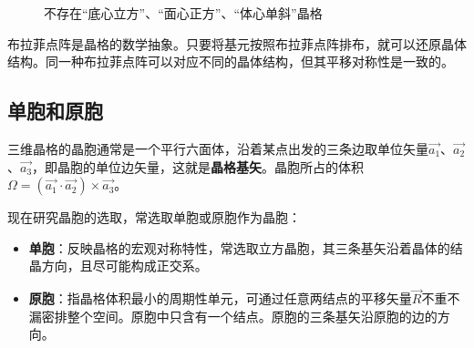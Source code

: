 \begin{figure}[!htbp]
\begin{minipage}[t]{0.3\linewidth}
        \end{minipage}
        \caption{不存在“底心立方”、“面心正方”、“体心单斜”晶格}
        \label{fig:1-06}
    \end{figure}

    布拉菲点阵是晶格的数学抽象。只要将基元按照布拉菲点阵排布，就可以还原晶体结构。同一种布拉菲点阵可以对应不同的晶体结构，但其平移对称性是一致的。

\subsection{单胞和原胞}
    三维晶格的晶胞通常是一个平行六面体，沿着某点出发的三条边取单位矢量$\vec{a_1}$、$\vec{a_2}$、$\vec{a_3}$，即晶胞的单位边矢量，这就是\textbf{晶格基矢}。晶胞所占的体积$\Omega=(\vec{a_1}\cdot \vec{a_2})\times \vec{a_3}$。

    现在研究晶胞的选取，常选取单胞或原胞作为晶胞：
    \begin{itemize}[itemsep=0pt,parsep=0pt]
        \item \textbf{单胞}：反映晶格的宏观对称特性，常选取立方晶胞，其三条基矢沿着晶体的结晶方向，且尽可能构成正交系。
        \item \textbf{原胞}：指晶格体积最小的周期性单元，可通过任意两结点的平移矢量$\vec{R}$不重不漏密排整个空间。原胞中只含有一个结点。原胞的三条基矢沿原胞的边的方向。
    \end{itemize}

